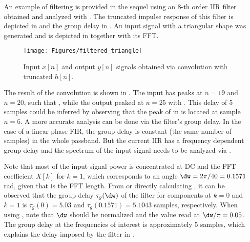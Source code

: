 An example of filtering is provided in the sequel using an 8-th order IIR filter obtained and analyzed with .
The truncated impulse response of this filter is depicted in  and the group delay in . An input signal  with a triangular shape was generated and is depicted in  together with its FFT.

\begin{figure}
\centering
\texttt{[image: Figures/filtered\_triangle]}
\caption{Input $x[n]$ and output $y[n]$ signals obtained via convolution with truncated $h[n]$.\label{fig:filtered_triangle}}
\end{figure}

The result of the convolution  is shown in . The input has peaks at $n=19$ and $n=20$, such that , while the output peaked at $n=25$ with .
This delay of 5 samples could be inferred by observing that the peak of  in
 is located at sample $n=6$. A more accurate analysis can be done via the filter's group delay. In the case of a linear-phase FIR, the group delay is constant (the same number of samples) in the whole passband. But the current IIR has a frequency dependent group delay and the spectrum of the input signal needs to be analyzed via .

Note that most of the input signal power is concentrated at DC and the FFT coefficient $X[k]$ for $k=1$, which corresponds to an angle $\dw=2 \pi / 40 = 0.1571$ rad, given that  is the FFT length. From  or directly calculating , it can be observed that the group delay $\tau_g(\dw)$ of the filter for components at $k=0$ and $k=1$ is $\tau_g(0)=5.03$ and $\tau_g(0.1571)=5.1043$ samples, respectively. When using , note that $\dw$ should be normalized and the value read at $\dw / \pi = 0.05$. The group delay at the frequencies of interest is approximately 5 samples, which explains the delay imposed by the filter in .

